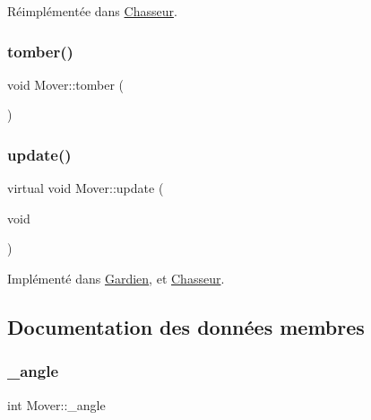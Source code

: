 Réimplémentée dans \hyperlink{classChasseur_ac33c7c026b2bb1c05d074fa196bd1fae}{Chasseur}.

\mbox{\label{classMover_afc87cc38041a7ccc2a0129d33b0b2a6a}} 
\subsubsection{\texorpdfstring{tomber()}{tomber()}}
{\footnotesize\ttfamily void Mover\+::tomber (\begin{DoxyParamCaption}{ }\end{DoxyParamCaption})}

\mbox{\label{classMover_a77684ae3483af98c82c9488ef3e80f05}} 
\subsubsection{\texorpdfstring{update()}{update()}}
{\footnotesize\ttfamily virtual void Mover\+::update (\begin{DoxyParamCaption}\item[{void}]{ }\end{DoxyParamCaption})\hspace{0.3cm}{\ttfamily [pure virtual]}}



Implémenté dans \hyperlink{classGardien_aed498f0d6bbb526e0373a914ba6bf9aa}{Gardien}, et \hyperlink{classChasseur_a6ea64de0a2708b21326dcb980f0e06ac}{Chasseur}.



\subsection{Documentation des données membres}
\mbox{\label{classMover_a76d84bfa5079c3a8ddf6d7f17e3898e2}} 
\subsubsection{\texorpdfstring{\+\_\+angle}{\_angle}}
{\footnotesize\ttfamily int Mover\+::\+\_\+angle}

\mbox{\label{classMover_a22a3132ed0579d2a155b1573a27604f3}} 
